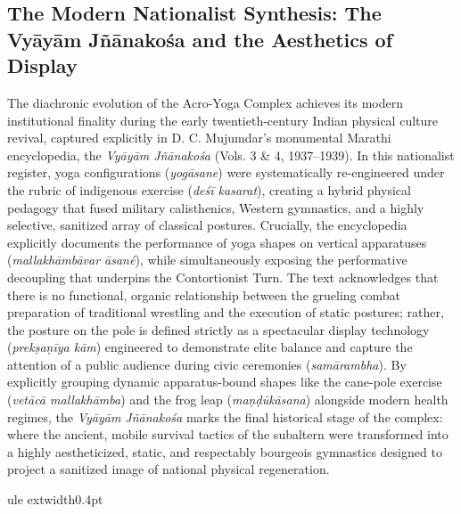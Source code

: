 \documentclass[11pt,letterpaper]{article}
\begin{document}
\subsection{The Modern Nationalist Synthesis: The Vyāyām Jñānakośa and the Aesthetics of Display}
The diachronic evolution of the Acro-Yoga Complex achieves its modern institutional finality during the early twentieth-century Indian physical culture revival, captured explicitly in D. C. Mujumdar’s monumental Marathi encyclopedia, the \textit{Vyāyām Jñānakośa} (Vols. 3 \& 4, 1937--1939). In this nationalist register, yoga configurations (\textit{yogāsane}) were systematically re-engineered under the rubric of indigenous exercise (\textit{deśī kasarat}), creating a hybrid physical pedagogy that fused military calisthenics, Western gymnastics, and a highly selective, sanitized array of classical postures. Crucially, the encyclopedia explicitly documents the performance of yoga shapes on vertical apparatuses (\textit{mallakhāmbāvar āsané}), while simultaneously exposing the performative decoupling that underpins the Contortionist Turn. The text acknowledges that there is no functional, organic relationship between the grueling combat preparation of traditional wrestling and the execution of static postures; rather, the posture on the pole is defined strictly as a spectacular display technology (\textit{prekṣaṇīya kām}) engineered to demonstrate elite balance and capture the attention of a public audience during civic ceremonies (\textit{samārambha}). By explicitly grouping dynamic apparatus-bound shapes like the cane-pole exercise (\textit{vetācā mallakhāmba}) and the frog leap (\textit{maṇḍūkāsana}) alongside modern health regimes, the \textit{Vyāyām Jñānakośa} marks the final historical stage of the complex: where the ancient, mobile survival tactics of the subaltern were transformed into a highly aestheticized, static, and respectably bourgeois gymnastics designed to project a sanitized image of national physical regeneration.


\indent
ule{	extwidth}{0.4pt}
\end{document}
